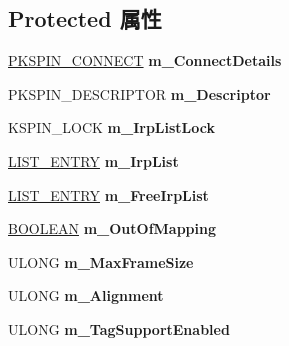 \subsection*{Protected 属性}
\begin{DoxyCompactItemize}
\item 
\mbox{\label{class_c_irp_queue_a92f73fe559e1475ba6e7d56a24b5b684}} 
\hyperlink{struct_k_s_p_i_n___c_o_n_n_e_c_t}{P\+K\+S\+P\+I\+N\+\_\+\+C\+O\+N\+N\+E\+CT} {\bfseries m\+\_\+\+Connect\+Details}
\item 
\mbox{\label{class_c_irp_queue_a356ba0b967c426c1fbb07989d5b122ce}} 
P\+K\+S\+P\+I\+N\+\_\+\+D\+E\+S\+C\+R\+I\+P\+T\+OR {\bfseries m\+\_\+\+Descriptor}
\item 
\mbox{\label{class_c_irp_queue_a6f131718b490b171596bb2a17506ff6d}} 
K\+S\+P\+I\+N\+\_\+\+L\+O\+CK {\bfseries m\+\_\+\+Irp\+List\+Lock}
\item 
\mbox{\label{class_c_irp_queue_a3847384aeb165b341ded8bb127b98c3e}} 
\hyperlink{struct___l_i_s_t___e_n_t_r_y}{L\+I\+S\+T\+\_\+\+E\+N\+T\+RY} {\bfseries m\+\_\+\+Irp\+List}
\item 
\mbox{\label{class_c_irp_queue_a3f2a391e96a454fc3b32c4cdb40e112f}} 
\hyperlink{struct___l_i_s_t___e_n_t_r_y}{L\+I\+S\+T\+\_\+\+E\+N\+T\+RY} {\bfseries m\+\_\+\+Free\+Irp\+List}
\item 
\mbox{\label{class_c_irp_queue_a579bba2494eb25aa51cf4e4b3fa78bd5}} 
\hyperlink{_processor_bind_8h_a112e3146cb38b6ee95e64d85842e380a}{B\+O\+O\+L\+E\+AN} {\bfseries m\+\_\+\+Out\+Of\+Mapping}
\item 
\mbox{\label{class_c_irp_queue_a22607243ac9821470c514af4ad7272fa}} 
U\+L\+O\+NG {\bfseries m\+\_\+\+Max\+Frame\+Size}
\item 
\mbox{\label{class_c_irp_queue_a886874568676c30a3fb112b68e39d1d6}} 
U\+L\+O\+NG {\bfseries m\+\_\+\+Alignment}
\item 
\mbox{\label{class_c_irp_queue_aa1f5661fe716423b3b5ebf5f75842c6d}} 
U\+L\+O\+NG {\bfseries m\+\_\+\+Tag\+Support\+Enabled}

\end{DoxyCompactItemize}
